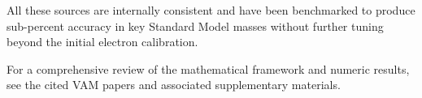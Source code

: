 \documentclass[11pt]{article}
\begin{document}
    All these sources are internally consistent and have been benchmarked to produce sub-percent accuracy in key Standard Model masses without further tuning beyond the initial electron calibration.

    \vspace{1em}
    For a comprehensive review of the mathematical framework and numeric results, see the cited VAM papers and associated supplementary materials.

    
    
    \vspace{1em}
\end{document}

